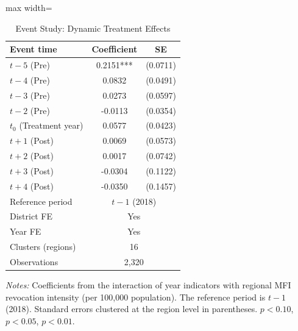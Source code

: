 \begin{table}[htbp]
\centering
\caption{Event Study: Dynamic Treatment Effects}
\label{tab:eventstudy}
\begin{adjustbox}{max width=\textwidth}
\begin{tabular}{lcc}
\toprule
Event time & Coefficient & SE \\
\midrule
$t-5$ (Pre) & 0.2151*** & (0.0711) \\
$t-4$ (Pre) & 0.0832 & (0.0491) \\
$t-3$ (Pre) & 0.0273 & (0.0597) \\
$t-2$ (Pre) & -0.0113 & (0.0354) \\
$t_0$ (Treatment year) & 0.0577 & (0.0423) \\
$t+1$ (Post) & 0.0069 & (0.0573) \\
$t+2$ (Post) & 0.0017 & (0.0742) \\
$t+3$ (Post) & -0.0304 & (0.1122) \\
$t+4$ (Post) & -0.0350 & (0.1457) \\
\addlinespace
Reference period & \multicolumn{2}{c}{$t-1$ (2018)} \\
\midrule
District FE & \multicolumn{2}{c}{Yes} \\
Year FE & \multicolumn{2}{c}{Yes} \\
Clusters (regions) & \multicolumn{2}{c}{16} \\
Observations & \multicolumn{2}{c}{2,320} \\
\bottomrule
\end{tabular}
\end{adjustbox}
\par\vspace{0.3em}
{\footnotesize \textit{Notes:} Coefficients from the interaction of year indicators with regional MFI revocation intensity (per 100,000 population). The reference period is $t-1$ (2018). Standard errors clustered at the region level in parentheses. \sym{*} $p<0.10$, \sym{**} $p<0.05$, \sym{***} $p<0.01$.
}
\end{table}


